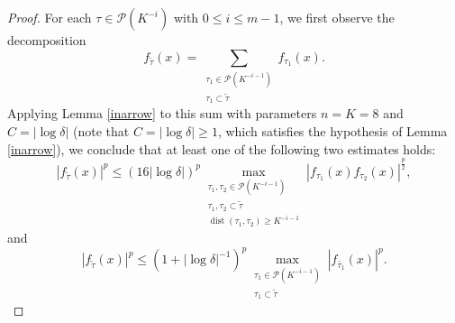 \documentclass[10pt,a4paper]{amsart}
\newcommand{\abs}[1]{\left|{#1}\right|}
\begin{document}
\begin{proof}
For each $\tau\in \mathcal{P}(K^{-i})$ with $0\leq i\leq m-1$, we first observe the decomposition
\begin{equation*}
    f_{\widetilde{\tau}}(x) = \sum_{\substack{ \tau_1 \in \mathcal{P}(K^{-i-1}) \\ \tau_1\subset {\widetilde{\tau}}}} f_{\tau_1}(x).
\end{equation*}
Applying Lemma \ref{inarrow} to this sum with parameters $n=K=8$ and $C=|\log\delta|$ (note that $C=|\log\delta|\geq1$, which satisfies the hypothesis of Lemma \ref{inarrow}), we conclude that at least one of the following two estimates holds:
\begin{equation}
    |f_{\widetilde{\tau}}(x)|^p \leq \left(16|\log\delta|\right)^p
        \max_{\substack{ \tau_1,\tau_2 \in \mathcal{P}(K^{-i-1}) \\
                        \tau_1,\tau_2 \subset {\widetilde{\tau}} \\
                        \operatorname{dist}(\tau_1,\tau_2) \geq  K^{-i-1} }}
        \abs{f_{\tau_1}(x)f_{\tau_2}(x)}^{\frac{p}{2}},
\end{equation}
and
\begin{equation}
    |f_{\widetilde{\tau}}(x)|^p \leq \left(1+|\log\delta|^{-1}\right)^p
        \max_{\substack{ \tau_1 \in \mathcal{P}(K^{-i-1}) \\
                        \tau_1\subset {\widetilde{\tau}}}} |f_{\widetilde{\tau_1}}(x)|^p.
\end{equation}


\end{proof}
\end{document}
